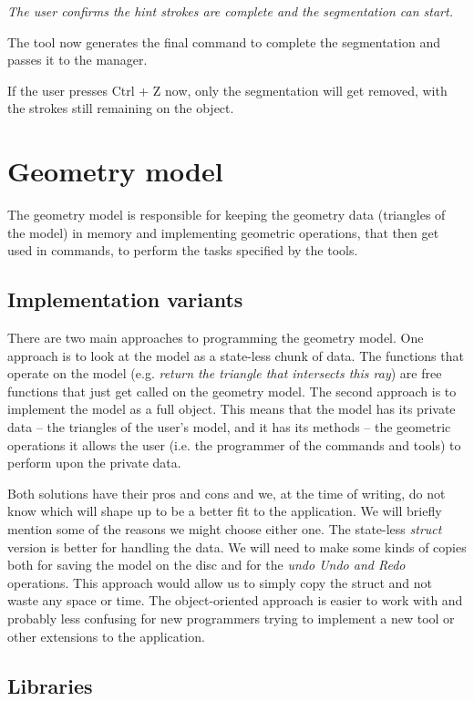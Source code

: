 \textit{The user confirms the hint strokes are complete and the segmentation can start.}

The tool now generates the final command to complete the segmentation and passes it to the manager.


If the user presses Ctrl + Z now, only the segmentation will get removed, with the strokes still remaining on the object.

\section{Geometry model}

The geometry model is responsible for keeping the geometry data (triangles of the model) in memory and implementing geometric operations, that then get used in commands, to perform the tasks specified by the tools.

\subsection{Implementation variants}

There are two main approaches to programming the geometry model. One approach is to look at the model as a state-less chunk of data. The functions that operate on the model (e.g. \textit{return the triangle that intersects this ray}) are free functions that just get called on the geometry model. The second approach is to implement the model as a full object. This means that the model has its private data -- the triangles of the user's model, and it has its methods -- the geometric operations it allows the user (i.e. the programmer of the commands and tools) to perform upon the private data.

Both solutions have their pros and cons and we, at the time of writing, do not know which will shape up to be a better fit to the application. We will briefly mention some of the reasons we might choose either one. The state-less \textit{struct} version is better for handling the data. We will need to make some kinds of copies both for saving the model on the disc and for the \textit{undo Undo and Redo} operations. This approach would allow us to simply copy the struct and not waste any space or time. The object-oriented approach is easier to work with and probably less confusing for new programmers trying to implement a new tool or other extensions to the application.

\subsection{Libraries}

